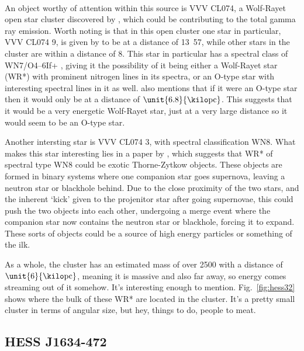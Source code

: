 \documentclass[a4paper, titlepage, oneside]{article}
\newcommand{\smass}{\mathrm{M_\odot}}
\newcommand{\parsec}{\mathrm{pc}}
\begin{document}
\begin{multicols}{2}
\paragraph{}
An object worthy of attention within this source is VVV CL074, a Wolf-Rayet open star cluster discovered by \textcite{Chene:2013}, which could be contributing to the total gamma ray emission. Worth noting is that in this open cluster one star in particular, VVV CL074 9, is given by \textcite{Chene:2013} to be at a distance of \unit{13.57}{\kilo\parsec}, while other stars in the cluster are within a distance of \unit{8}{\kilo\parsec}. This star in particular has a spectral class of WN7/O4–6If+ \parencite{Chene:2013}, giving it the possibility of it being either a Wolf-Rayet star (WR*) with prominent nitrogen lines in its spectra, or an O-type star with interesting spectral lines in it as well. \textcite{Chene:2013} also mentions that if it were an O-type star then it would only be at a distance of \(\unit{6.8}{\kilo\parsec}\). This suggests that it would be a very energetic Wolf-Rayet star, just at a very large distance so it would seem to be an O-type star.

Another intersting star is VVV CL074 3, with spectral classification WN8. What makes this star interesting lies in a paper by \textcite{Foellmi:2002}, which suggests that WR* of spectral type WN8 could be exotic Thorne-Zytkow objects. These objects are formed in binary systems where one companion star goes supernova, leaving a neutron star or blackhole behind. Due to the close proximity of the two stars, and the inherent `kick' given to the projenitor star after going supernovae, this could push the two objects into each other, undergoing a merge event where the companion star now contains the neutron star or blackhole, forcing it to expand. These sorts of objects could be a source of high energy particles or something of the ilk.

As a whole, the cluster has an estimated mass of over \unit{2500}{\smass} with a distance of \(\unit{6}{\kilo\parsec}\), meaning it is massive and also far away, so energy comes streaming out of it somehow. It's interesting enough to mention. Fig.~\ref{fig:hess32} shows where the bulk of these WR* are located in the cluster. It's a pretty small cluster in terms of angular size, but hey, things to do, people to meat.

\subsection{HESS J1634-472}


\end{multicols}
\end{document}
